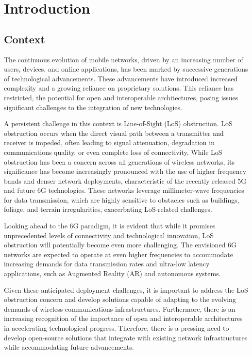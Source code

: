 \chapter{Introduction} \label{ch:intro}

\section{Context}\label{sec:context}

The continuous evolution of mobile networks, driven by an increasing number of users, devices, and online applications, has been marked by successive generations of technological advancements.
These advancements have introduced increased complexity and a growing reliance on proprietary solutions.
This reliance has restricted, the potential for open and interoperable architectures, posing issues significant challenges to the integration of new technologies.

A persistent challenge in this context is Line-of-Sight (LoS) obstruction.
LoS obstruction occurs when the direct visual path between a transmitter and receiver is impeded, often leading to signal attenuation, degradation in communications quality, or even complete loss of connectivity.
While LoS obstruction has been a concern across all generations of wireless networks, its significance has become increasingly pronounced with the use of higher frequency bands and denser network deployments, characteristic of the recently released 5G and future 6G technologies.
These networks leverage millimeter-wave frequencies for data transmission, which are highly sensitive to obstacles such as buildings, foliage, and terrain irregularities, exacerbating LoS-related challenges.

Looking ahead to the 6G paradigm, it is evident that while it promises unprecedented levels of connectivity and technological innovation,  LoS obstruction will potentially become even more challenging.
The envisioned 6G networks are expected to operate at even higher frequencies to accommodate increasing demands for data transmission rates and ultra-low latency applications, such as Augmented Reality (AR) and autonomous systems.

Given these anticipated deployment challenges, it is important to address the  LoS obstruction concern and develop solutions capable of adapting to the evolving demands of wireless communications infrastructures.
Furthermore, there is an increasing recognition of the importance of open and interoperable architectures in accelerating technological progress.
Therefore, there is a pressing need to develop open-source solutions that integrate with existing network infrastructures while accommodating future advancements.


